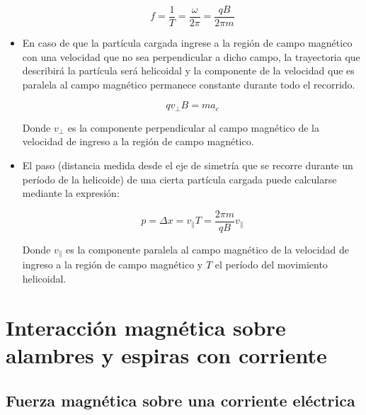 \documentclass[a4paper,10pt]{article}
\begin{document}
\begin{itemize}
\begin{equation*}
    \boxed{
    f=\frac{1}{T}=\frac{\omega}{2\pi}=\frac{qB}{2\pi m}
    }
\end{equation*}

\item En caso de que la partícula cargada ingrese a la región de campo
magnético con una velocidad que no sea perpendicular a dicho campo, la
trayectoria que describirá la partícula será helicoidal y la componente
de la velocidad que es paralela al campo magnético permanece constante
durante todo el recorrido.

\begin{equation*}
    \boxed{
    qv_\perp B=ma_c
    }
\end{equation*}

Donde $v_\perp$ es la componente perpendicular al campo magnético de la velocidad
de ingreso a la región de campo magnético.

\item El paso (distancia medida desde el eje de simetría que se recorre
durante un período de la helicoide) de una cierta partícula cargada puede
calcularse mediante la expresión:

\begin{equation*}
    \boxed{
    p=\Delta x=v_\parallel T=\frac{2\pi m}{qB}v_\parallel
    }
\end{equation*}

Donde $v_\parallel$ es la componente paralela al campo magnético de la velocidad
de ingreso a la región de campo magnético y $T$ el período del movimiento
helicoidal.

\end{itemize}


\section{Interacción magnética sobre alambres y espiras con corriente}


\subsection{Fuerza magnética sobre una corriente eléctrica}
\end{document}
